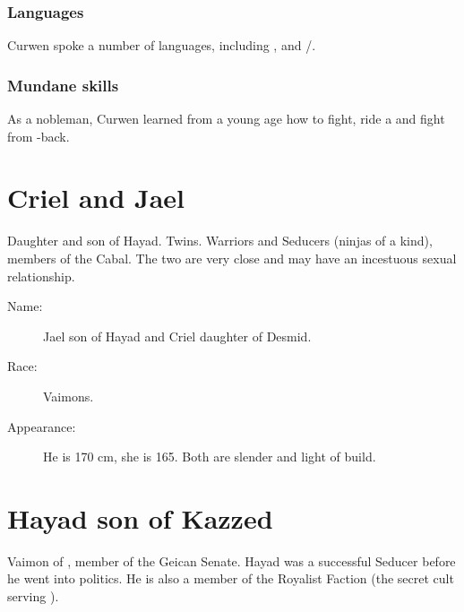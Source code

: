 \subsubsection{Languages}
Curwen spoke a number of languages, including ,  and /. 





\subsubsection{Mundane skills}
As a nobleman, Curwen learned from a young age how to fight, ride a \relc{} and fight from \relc-back. 















\section{Criel and Jael}
Daughter and son of Hayad. Twins. Warriors and Seducers (ninjas of a kind), members of the Cabal. The two are very close and may have an incestuous sexual relationship. 

\begin{description}
  \item[Name:] Jael son of Hayad and Criel daughter of Desmid. 
  \item[Race:] Vaimons. 
  \item[Appearance:] He is 170 cm, she is 165. Both are slender and light of build. 
\end{description}
















\section{Hayad son of Kazzed}
Vaimon of \ClanGeican, member of the Geican Senate. Hayad was a successful Seducer before he went into politics. He is also a member of the Royalist Faction (the secret cult serving \Belzir). 

